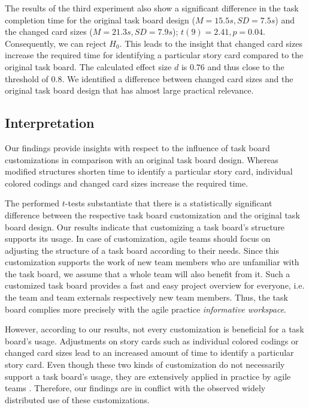 \documentclass{llncs}
\begin{document}
The results of the third experiment also show a significant difference in the 
task completion time for the original task board design ($M = 15.5s, SD = 
7.5s$) and the changed card sizes ($M = 21.3 s, SD = 7.9 s$); $t(9) = 2.41, p = 
0.04$. Consequently, we can reject $H_{0}$. This leads to the insight that 
changed card sizes increase the required time for identifying a particular 
story card compared to the original task board. The calculated effect size $d$ 
is $0.76$ and thus close to the threshold of $0.8$. We identified a difference 
between changed card sizes and the original task board design that has 
almost large practical relevance.

\subsection{Interpretation}
Our findings provide insights with respect to the influence of task board 
customizations in comparison with an original task board design. Whereas 
modified structures shorten time to identify a particular story card, 
individual colored codings and changed card sizes increase the required time.

The performed $t$-tests substantiate that there is a statistically significant 
difference between the respective task board customization and the original 
task board design. Our results indicate that customizing a task board's 
structure supports its usage. In case of customization, agile teams should 
focus on adjusting the structure of a task board according to their needs. 
Since this customization supports the work of new team members who are 
unfamiliar with the task board, we assume that a whole team will also benefit 
from it. Such a customized task board provides a fast and easy project 
overview for everyone, i.e. the team and team externals respectively 
new team members. Thus, the task board complies more precisely with the 
agile practice \textit{informative workspace}.

However, according to our results, not every customization is beneficial for a 
task board's usage. Adjustments on story cards such as individual colored 
codings or changed card sizes lead to an increased amount of time to identify a 
particular story card. Even though these two kinds of customization do not 
necessarily support a task board's usage, they are extensively applied in 
practice by agile teams \cite{Liskin.2014, Sharp.2006, Sharp.2008, Sharp.2009}. 
Therefore, our findings are in conflict with the observed widely distributed 
use of these customizations.
\end{document}
